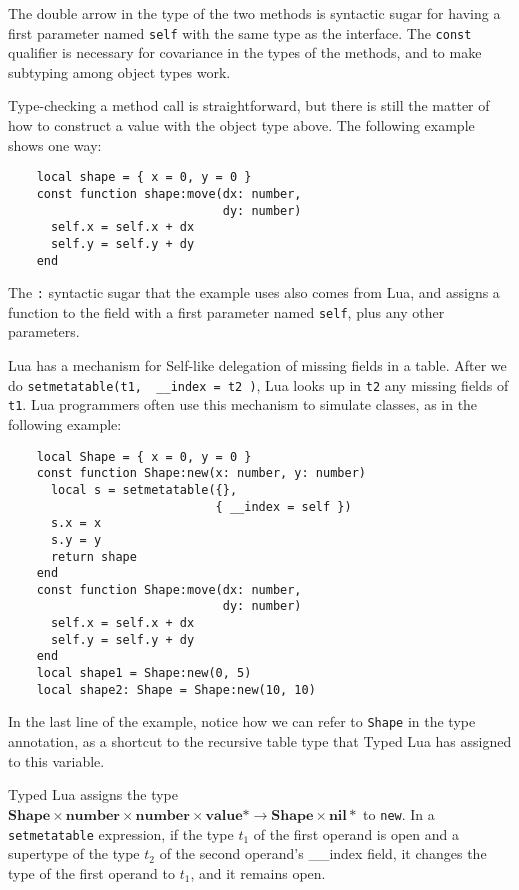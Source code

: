 \documentclass[preprint]{sig-alternate}
\newcommand{\Top}{\mathbf{value}}
\newcommand{\Nil}{\mathbf{nil}}
\newcommand{\Number}{\mathbf{number}}
\begin{document}
The double arrow in the type of the two methods is
syntactic sugar for having a first parameter named
{\tt self} with the same type as the interface. The
{\tt const} qualifier is necessary for covariance
in the types of the methods, and to make subtyping
among object types work.

Type-checking a method call is straightforward, but
there is still the matter of how to construct a value with
the object type above. The following example shows one
way:

\begin{verbatim}
    local shape = { x = 0, y = 0 }
    const function shape:move(dx: number, 
                              dy: number)
      self.x = self.x + dx
      self.y = self.y + dy
    end
\end{verbatim}

The {\tt :} syntactic sugar that the example uses also comes
from Lua, and assigns a function to the field with a first
parameter named {\tt self}, plus any other parameters.

Lua has a mechanism for Self-like delegation of missing
fields in a table. After we do {\tt setmetatable(t1,
{ \_\_index = t2 })}, Lua looks up in {\tt t2} any missing
fields of {\tt t1}. Lua programmers often use this mechanism
to simulate classes, as in the following example:

\begin{verbatim}
    local Shape = { x = 0, y = 0 }
    const function Shape:new(x: number, y: number)
      local s = setmetatable({},
                             { __index = self })
      s.x = x
      s.y = y
      return shape
    end
    const function Shape:move(dx: number,
                              dy: number)
      self.x = self.x + dx
      self.y = self.y + dy
    end
    local shape1 = Shape:new(0, 5)
    local shape2: Shape = Shape:new(10, 10)
\end{verbatim} 

In the last line of the example, notice how we can refer
to {\tt Shape} in the type annotation, as a shortcut
to the recursive table type that Typed Lua has assigned
to this variable.

Typed Lua assigns the type
$\mathbf{Shape} \times \Number \times \Number \times
\Top* \rightarrow \mathbf{Shape} \times \Nil*$ to
{\tt new}. In a {\tt setmetatable} expression,
if the type $t_1$ of the first operand is open and a supertype
of the type $t_2$ of the second operand's {\_\_index} field,
it changes the type of the first operand to $t_1$, and
it remains open.
\end{document}
